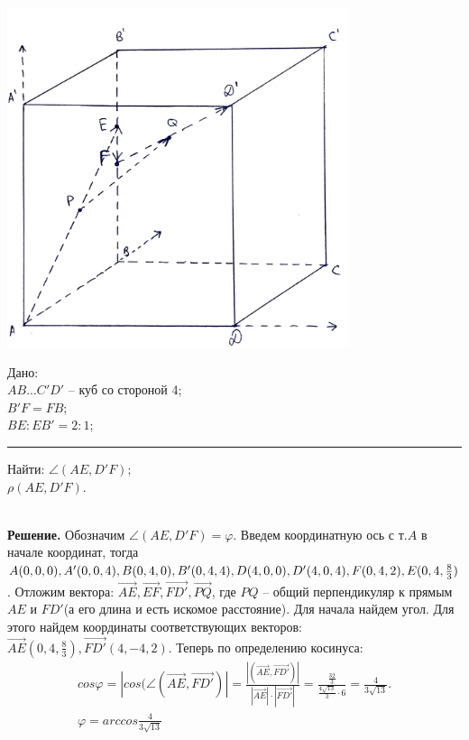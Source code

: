 \documentclass[a4paper, 12pt]{article}
\begin{document}
\begin{spacing}{1}
\begin{minipage}[c]{50mm}
	\includegraphics[width=100mm]{picture.pdf}
\end{minipage} \hfill
\begin{minipage}[b]{60mm}
	Дано: \\
	$AB...C'D'$ -- куб со стороной 4;\\
	$B'F=FB$;\\
	$BE:EB'=2:1$;
	\medskip\hrule\medskip
	Найти:
	$\angle(AE,D'F)$;\\
	$\rho(AE, D'F)$.
\end{minipage}\\
\noindent \textbf{Решение.} Обозначим $\angle(AE,D'F) = \varphi$. Введем координатную ось с т.$A$ в начале координат, тогда $A(0, 0, 0), A'(0, 0, 4), B(0,4,0),\\
B'(0, 4, 4), D(4,0,0), D'(4,0,4), F(0, 4, 2), E(0, 4, \frac{8}{3})$. Отложим вектора: $\overrightarrow{AE}, \overrightarrow{EF}, \overrightarrow{FD'}, \overrightarrow{PQ}$, где $PQ$ -- общий перпендикуляр к прямым $AE$ и $FD'$(а его длина и есть искомое расстояние). Для начала найдем угол.  Для этого найдем координаты соответствующих векторов: $\overrightarrow{AE}(0, 4, \frac{8}{3}), \overrightarrow{FD'}(4, -4, 2)$. Теперь по определению косинуса:
\begin{gather*}
cos\varphi = |cos(\angle(\overrightarrow{AE}, \overrightarrow{FD'})| = \frac{|(\overrightarrow{AE},\overrightarrow{FD'})|}{|\overrightarrow{AE}|\cdot |\overrightarrow{FD'}|} = \frac{\frac{32}{3}}{\frac{4\sqrt{13}}{3}\cdot 6} = \frac{4}{3\sqrt{13}}.\\
\varphi = arccos\frac{4}{3\sqrt{13}}

\end{gather*}
\end{spacing}
\end{document}
